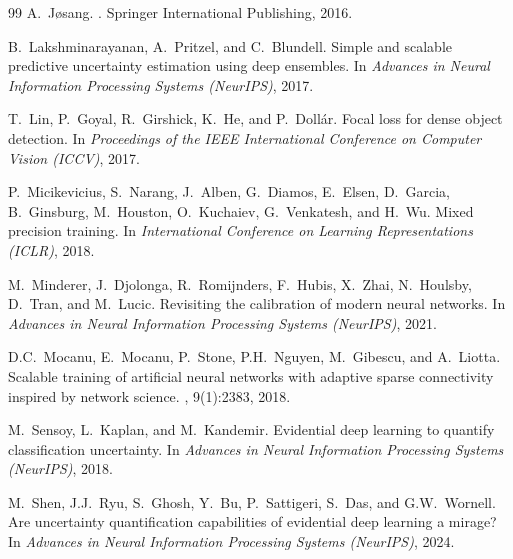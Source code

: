 \documentclass[letterpaper]{article} %
\begin{document}
\begin{thebibliography}{99}
A.~J{\o}sang.
.
\newblock Springer International Publishing, 2016.

B.~Lakshminarayanan, A.~Pritzel, and C.~Blundell.
\newblock Simple and scalable predictive uncertainty estimation using deep ensembles.
\newblock In {\em Advances in Neural Information Processing Systems (NeurIPS)}, 2017.

T.~Lin, P.~Goyal, R.~Girshick, K.~He, and P.~Doll{\'a}r.
\newblock Focal loss for dense object detection.
\newblock In {\em Proceedings of the IEEE International Conference on Computer Vision (ICCV)}, 2017.

P.~Micikevicius, S.~Narang, J.~Alben, G.~Diamos, E.~Elsen, D.~Garcia, B.~Ginsburg, M.~Houston, O.~Kuchaiev, G.~Venkatesh, and H.~Wu.
\newblock Mixed precision training.
\newblock In {\em International Conference on Learning Representations (ICLR)}, 2018.

M.~Minderer, J.~Djolonga, R.~Romijnders, F.~Hubis, X.~Zhai, N.~Houlsby, D.~Tran, and M.~Lucic.
\newblock Revisiting the calibration of modern neural networks.
\newblock In {\em Advances in Neural Information Processing Systems (NeurIPS)}, 2021.

D.C.~Mocanu, E.~Mocanu, P.~Stone, P.H.~Nguyen, M.~Gibescu, and A.~Liotta.
\newblock Scalable training of artificial neural networks with adaptive sparse connectivity inspired by network science.
, 9(1):2383, 2018.

M.~Sensoy, L.~Kaplan, and M.~Kandemir.
\newblock Evidential deep learning to quantify classification uncertainty.
\newblock In {\em Advances in Neural Information Processing Systems (NeurIPS)}, 2018.

M.~Shen, J.J.~Ryu, S.~Ghosh, Y.~Bu, P.~Sattigeri, S.~Das, and G.W.~Wornell.
\newblock Are uncertainty quantification capabilities of evidential deep learning a mirage?
\newblock In {\em Advances in Neural Information Processing Systems (NeurIPS)}, 2024.


\end{thebibliography}
\end{document}
